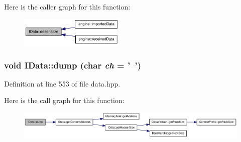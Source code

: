 Here is the caller graph for this function:\nopagebreak
\begin{figure}[H]
\begin{center}
\leavevmode
\includegraphics[width=142pt]{class_i_data_a1ab1fff22b5ba4cd4fb93cd09007dda6_icgraph}
\end{center}
\end{figure}
\hypertarget{class_i_data_aae35cd74cf8b062a958959d606d73f29}{
\subsubsection[{dump}]{\setlength{\rightskip}{0pt plus 5cm}void IData::dump (char {\em ch} = {\ttfamily '~'})}}
\label{class_i_data_aae35cd74cf8b062a958959d606d73f29}


Definition at line 553 of file data.hpp.

Here is the call graph for this function:\nopagebreak
\begin{figure}[H]
\begin{center}
\leavevmode
\includegraphics[width=395pt]{class_i_data_aae35cd74cf8b062a958959d606d73f29_cgraph}
\end{center}
\end{figure}


